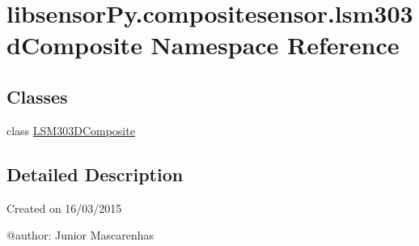 \hypertarget{namespacelibsensorPy_1_1compositesensor_1_1lsm303dComposite}{}\section{libsensor\+Py.\+compositesensor.\+lsm303d\+Composite Namespace Reference}
\label{namespacelibsensorPy_1_1compositesensor_1_1lsm303dComposite}
\subsection*{Classes}
\begin{DoxyCompactItemize}
\item 
class \hyperlink{classlibsensorPy_1_1compositesensor_1_1lsm303dComposite_1_1LSM303DComposite}{L\+S\+M303\+D\+Composite}
\end{DoxyCompactItemize}


\subsection{Detailed Description}
\begin{DoxyVerb}Created on 16/03/2015

@author: Junior Mascarenhas
\end{DoxyVerb}
 